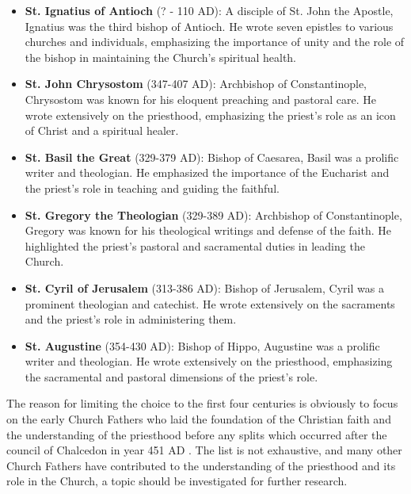 \documentclass[12pt,doc]{apa7}   	%
\begin{document}
\begin{itemize}
    \item \textbf{St. Ignatius of Antioch} (? - 110 AD): A disciple of St. John the Apostle, Ignatius was the third bishop of Antioch. He wrote seven epistles to various churches and individuals, emphasizing the importance of unity and the role of the bishop in maintaining the Church’s spiritual health.
    \item \textbf{St. John Chrysostom} (347-407 AD): Archbishop of Constantinople, Chrysostom was known for his eloquent preaching and pastoral care. He wrote extensively on the priesthood, emphasizing the priest’s role as an icon of Christ and a spiritual healer.
    \item \textbf{St. Basil the Great} (329-379 AD): Bishop of Caesarea, Basil was a prolific writer and theologian. He emphasized the importance of the Eucharist and the priest’s role in teaching and guiding the faithful.
    \item \textbf{St. Gregory the Theologian} (329-389 AD): Archbishop of Constantinople, Gregory was known for his theological writings and defense of the faith. He highlighted the priest’s pastoral and sacramental duties in leading the Church.
    \item \textbf{St. Cyril of Jerusalem} (313-386 AD): Bishop of Jerusalem, Cyril was a prominent theologian and catechist. He wrote extensively on the sacraments and the priest’s role in administering them.
    \item \textbf{St. Augustine} (354-430 AD): Bishop of Hippo, Augustine was a prolific writer and theologian. He wrote extensively on the priesthood, emphasizing the sacramental and pastoral dimensions of the priest’s role.
\end{itemize}
    
The reason for limiting the choice to the first four centuries is obviously to focus on the early Church Fathers who laid the foundation of the Christian faith and the understanding of the priesthood before any splits which occurred after the  council of Chalcedon in year 451 AD \citep{early_church_akin}.  The list is not exhaustive, and many other Church Fathers have contributed to the understanding of the priesthood and its role in the Church, a topic should be investigated for further research.
\end{document}
